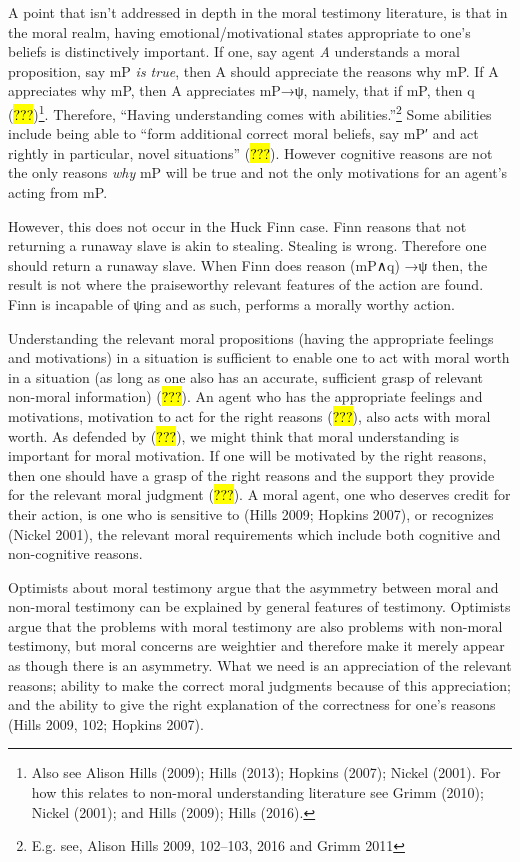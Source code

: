 \documentclass[
  letterpaper,
  DIV=11,
  numbers=noendperiod]{scrartcl}
\theoremstyle{remark}
\begin{document}
A point that isn't addressed in depth in the moral testimony literature,
is that in the moral realm, having emotional/motivational states
appropriate to one's beliefs is distinctively important. If one, say
agent \emph{A} understands a moral proposition, say mP \emph{is true},
then A should appreciate the reasons why mP. If A appreciates why mP,
then A appreciates mP→ψ, namely, that if mP, then q
(\hl{???})\footnote{Also see Alison Hills (2009); Hills (2013); Hopkins
  (2007); Nickel (2001). For how this relates to non-moral understanding
  literature see Grimm (2010); Nickel (2001); and Hills (2009); Hills
  (2016).}. Therefore, ``Having understanding comes with
abilities.''\footnote{E.g. see, Alison Hills 2009, 102--103, 2016 and
  Grimm 2011} Some abilities include being able to ``form additional
correct moral beliefs, say mP′ and act rightly in particular, novel
situations'' (\hl{???}). However cognitive reasons are not the only
reasons \emph{why} mP will be true and not the only motivations for an
agent's acting from mP.

However, this does not occur in the Huck Finn case. Finn reasons that
not returning a runaway slave is akin to stealing. Stealing is wrong.
Therefore one should return a runaway slave. When Finn does reason
(mP∧q) →ψ then, the result is not where the praiseworthy relevant
features of the action are found. Finn is incapable of ψing and as such,
performs a morally worthy action.

Understanding the relevant moral propositions (having the appropriate
feelings and motivations) in a situation is sufficient to enable one to
act with moral worth in a situation (as long as one also has an
accurate, sufficient grasp of relevant non-moral information)
(\hl{???}). An agent who has the appropriate feelings and motivations,
motivation to act for the right reasons (\hl{???}), also acts with moral
worth. As defended by (\hl{???}), we might think that moral
understanding is important for moral motivation. If one will be
motivated by the right reasons, then one should have a grasp of the
right reasons and the support they provide for the relevant moral
judgment (\hl{???}). A moral agent, one who deserves credit for their
action, is one who is sensitive to (Hills 2009; Hopkins 2007), or
recognizes (Nickel 2001), the relevant moral requirements which include
both cognitive and non-cognitive reasons.

Optimists about moral testimony argue that the asymmetry between moral
and non-moral testimony can be explained by general features of
testimony. Optimists argue that the problems with moral testimony are
also problems with non-moral testimony, but moral concerns are weightier
and therefore make it merely appear as though there is an asymmetry.
What we need is an appreciation of the relevant reasons; ability to make
the correct moral judgments because of this appreciation; and the
ability to give the right explanation of the correctness for one's
reasons (Hills 2009, 102; Hopkins 2007).
\end{document}
